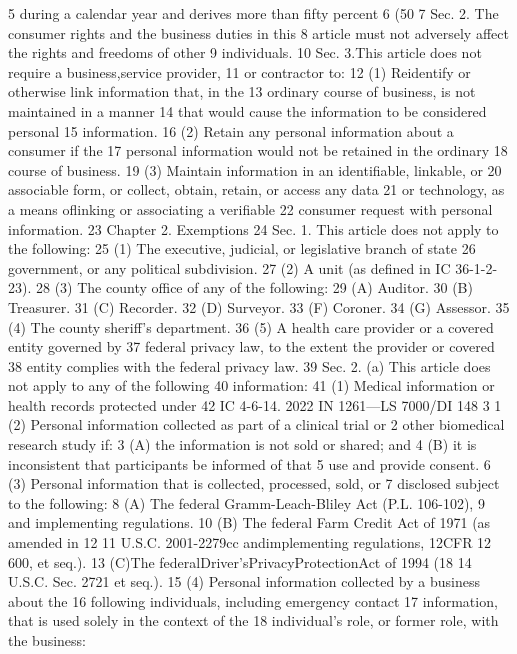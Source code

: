 5 during a calendar year and derives more than fifty percent
6 (50%
7 Sec. 2. The consumer rights and the business duties in this
8 article must not adversely affect the rights and freedoms of other
9 individuals.
10 Sec. 3.This article does not require a business,service provider,
11 or contractor to:
12 (1) Reidentify or otherwise link information that, in the
13 ordinary course of business, is not maintained in a manner
14 that would cause the information to be considered personal
15 information.
16 (2) Retain any personal information about a consumer if the
17 personal information would not be retained in the ordinary
18 course of business.
19 (3) Maintain information in an identifiable, linkable, or
20 associable form, or collect, obtain, retain, or access any data
21 or technology, as a means oflinking or associating a verifiable
22 consumer request with personal information.
23 Chapter 2. Exemptions
24 Sec. 1. This article does not apply to the following:
25 (1) The executive, judicial, or legislative branch of state
26 government, or any political subdivision.
27 (2) A unit (as defined in IC 36-1-2-23).
28 (3) The county office of any of the following:
29 (A) Auditor.
30 (B) Treasurer.
31 (C) Recorder.
32 (D) Surveyor.
33 (F) Coroner.
34 (G) Assessor.
35 (4) The county sheriff's department.
36 (5) A health care provider or a covered entity governed by
37 federal privacy law, to the extent the provider or covered
38 entity complies with the federal privacy law.
39 Sec. 2. (a) This article does not apply to any of the following
40 information:
41 (1) Medical information or health records protected under
42 IC 4-6-14.
2022 IN 1261—LS 7000/DI 148
3
1 (2) Personal information collected as part of a clinical trial or
2 other biomedical research study if:
3 (A) the information is not sold or shared; and
4 (B) it is inconsistent that participants be informed of that
5 use and provide consent.
6 (3) Personal information that is collected, processed, sold, or
7 disclosed subject to the following:
8 (A) The federal Gramm-Leach-Bliley Act (P.L. 106-102),
9 and implementing regulations.
10 (B) The federal Farm Credit Act of 1971 (as amended in 12
11 U.S.C. 2001-2279cc andimplementing regulations, 12CFR
12 600, et seq.).
13 (C)The federalDriver'sPrivacyProtectionAct of 1994 (18
14 U.S.C. Sec. 2721 et seq.).
15 (4) Personal information collected by a business about the
16 following individuals, including emergency contact
17 information, that is used solely in the context of the
18 individual's role, or former role, with the business:

